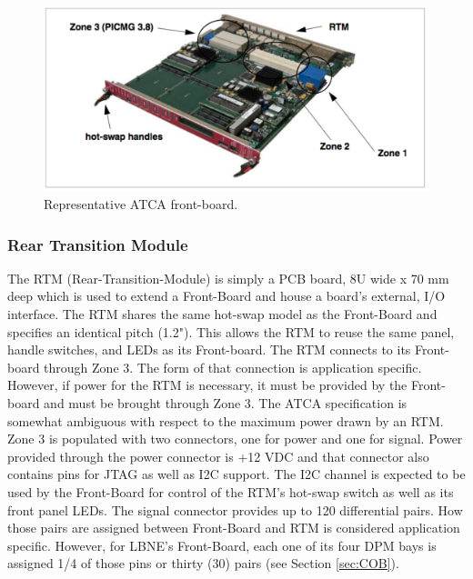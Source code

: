 \begin{figure}[tbh]
\includegraphics[scale=0.8]{front-boardpdf.pdf}
\caption{Representative ATCA front-board.}
\label{fig:frontBoard}
\end{figure} 

\subsubsection{Rear Transition Module}
\label{sec:rtm}
The RTM (Rear-Transition-Module) is simply a PCB board, 8U wide x 70 mm deep which is used to extend a Front-Board and  house a board's external, I/O interface. The RTM shares the same hot-swap model as the Front-Board and specifies an identical pitch (1.2"). This allows the RTM to reuse the same panel, handle switches, and LEDs as its Front-board. The RTM connects to its Front-board through Zone 3. The form of that connection is application specific. However, if power for the RTM is necessary, it must be provided by the Front-board and must be brought through Zone 3. The ATCA specification is somewhat ambiguous with respect to the maximum power drawn by an RTM.   Zone 3 is populated with two connectors, one for power and one for signal. Power provided through the power connector is +12 VDC and that connector also contains pins for JTAG as well as I2C support. The I2C channel is expected to be used by the Front-Board for control of the RTM's hot-swap switch as well as its front panel LEDs.
The signal connector provides up to 120 differential pairs. How those pairs are assigned between Front-Board and RTM is considered application specific. However, for LBNE's Front-Board, each one of its four DPM bays is assigned 1/4 of those pins or thirty (30) pairs (see Section \ref{sec:COB}).

